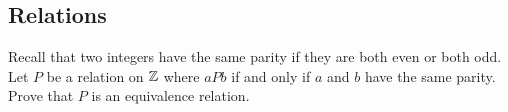 \documentclass[]{exam}
\begin{document}
\begin{questions}
%
%
%
%
%
%
%

\section*{Relations}

\question Recall that two integers have the same parity if they are both
          even or both odd. Let $P$ be a relation on $\mathbb{Z}$ where $aPb$
          if and only if $a$ and $b$ have the same parity. Prove that
          $P$ is an equivalence relation.


\end{questions}
\end{document}
